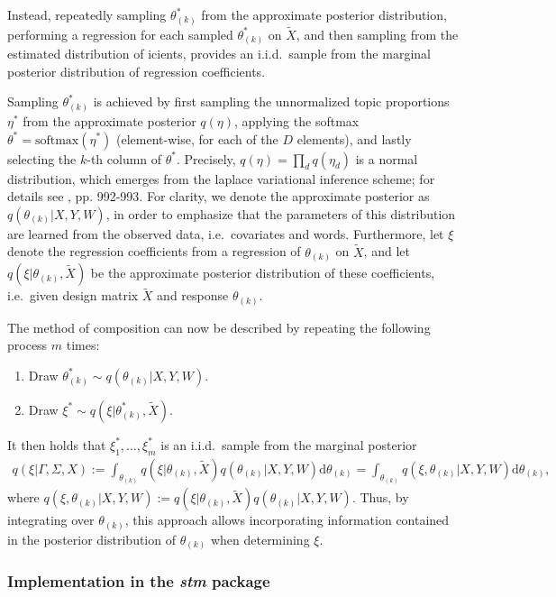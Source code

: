 Instead, repeatedly sampling $\theta_{(k)}^*$ from the approximate posterior distribution, performing a regression for each sampled $\theta_{(k)}^*$ on $\tilde{X}$, and then sampling from the estimated distribution of 
icients, provides an i.i.d.\ sample from the marginal posterior distribution of regression coefficients. 

Sampling $\theta_{(k)}^*$ is achieved by first sampling the unnormalized topic proportions $\eta^*$ from the approximate posterior $q(\eta)$, applying the softmax $\theta^* = \text{softmax}(\eta^*)$ (element-wise, for each of the $D$ elements), and lastly selecting the $k$-th column of $\theta^*$. Precisely, $q(\eta) = \prod_d q(\eta_d)$ is a normal distribution, which emerges from the laplace variational inference scheme; for details see \cite{roberts2016model}, pp. 992-993. For clarity, we denote the approximate posterior as $q(\theta_{(k)} | X, Y, W)$, in order to emphasize that the parameters of this distribution are learned from the observed data, i.e.\ covariates and words. Furthermore, let $\xi$ denote the regression coefficients from a regression of $\theta_{(k)}$ on $\tilde{X}$, and let $q(\xi| \theta_{(k)}, \tilde{X})$ be the approximate posterior distribution of these coefficients, i.e.\ given design matrix $\tilde{X}$ and response $\theta_{(k)}$.

The method of composition can now be described by repeating the following process $m$ times:
\begin{enumerate}
\item Draw $\theta_{(k)}^* \sim q(\theta_{(k)} | X, Y, W)$.
\item Draw $\xi^* \sim q(\xi| \theta_{(k)}^*, \tilde{X})$.
\end{enumerate}

It then holds that $\xi_1^*, \dots, \xi_m^*$ is an i.i.d.\ sample from the marginal posterior
\begin{align*}
q(\xi | \Gamma, \Sigma, X) := \int_{\theta_{(k)}} q(\xi| \theta_{(k)}, \tilde{X}) q(\theta_{(k)} | X, Y, W) \text{d} \theta_{(k)} = \int_{\theta_{(k)}} q(\xi, \theta_{(k)} | X, Y, W) \text{d} \theta_{(k)}, 
\end{align*}
where $q(\xi, \theta_{(k)} | X, Y, W) := q(\xi| \theta_{(k)}, \tilde{X}) q(\theta_{(k)} | X, Y, W)$. Thus, by integrating over $\theta_{(k)}$, this approach allows incorporating information contained in the posterior distribution of $\theta_{(k)}$ when determining $\xi$.

\subsubsection{Implementation in the \textit{stm} package}

